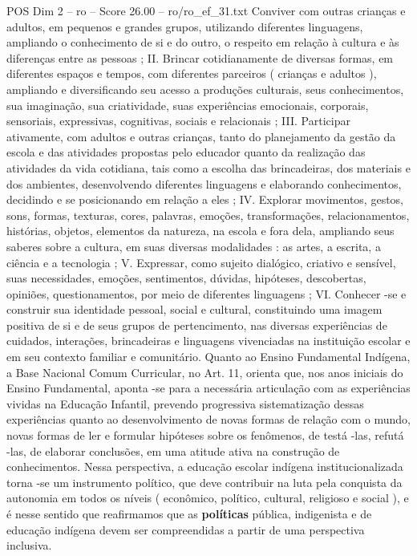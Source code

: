 \begin{textsample}{POS Dim 2 – ro – Score 26.00 – ro/ro\_ef\_31.txt}
Conviver com outras crianças e adultos, em pequenos e grandes grupos, utilizando diferentes linguagens, ampliando o conhecimento de si e do outro, o respeito em relação à cultura e às diferenças entre as pessoas ; II.
Brincar cotidianamente de diversas formas, em diferentes espaços e tempos, com diferentes parceiros ( crianças e adultos ), ampliando e diversificando seu acesso a produções culturais, seus conhecimentos, sua imaginação, sua criatividade, suas experiências emocionais, corporais, sensoriais, expressivas, cognitivas, sociais e relacionais ; III.
Participar ativamente, com adultos e outras crianças, tanto do planejamento da gestão da escola e das atividades propostas pelo educador quanto da realização das atividades da vida cotidiana, tais como a escolha das brincadeiras, dos materiais e dos ambientes, desenvolvendo diferentes linguagens e elaborando conhecimentos, decidindo e se posicionando em relação a eles ; IV.
Explorar movimentos, gestos, sons, formas, texturas, cores, palavras, emoções, transformações, relacionamentos, histórias, objetos, elementos da natureza, na escola e fora dela, ampliando seus saberes sobre a cultura, em suas diversas modalidades : as artes, a escrita, a ciência e a tecnologia ; V.
Expressar, como sujeito dialógico, criativo e sensível, suas necessidades, emoções, sentimentos, dúvidas, hipóteses, descobertas, opiniões, questionamentos, por meio de diferentes linguagens ; VI.
Conhecer -se e construir sua identidade pessoal, social e cultural, constituindo uma imagem positiva de si e de seus grupos de pertencimento, nas diversas experiências de cuidados, interações, brincadeiras e linguagens vivenciadas na instituição escolar e em seu contexto familiar e comunitário.
Quanto ao Ensino Fundamental Indígena, a Base Nacional Comum Curricular, no Art. 11, orienta que, nos anos iniciais do Ensino Fundamental, aponta -se para a necessária articulação com as experiências vividas na Educação Infantil, prevendo progressiva sistematização dessas experiências quanto ao desenvolvimento de novas formas de relação com o mundo, novas formas de ler e formular hipóteses sobre os fenômenos, de testá -las, refutá -las, de elaborar conclusões, em uma atitude ativa na construção de conhecimentos.
Nessa perspectiva, a educação escolar indígena institucionalizada torna -se um instrumento político, que deve contribuir na luta pela conquista da autonomia em todos os níveis ( econômico, político, cultural, religioso e social ), e é nesse sentido que reafirmamos que as \textbf{políticas} pública, indigenista e de educação indígena devem ser compreendidas a partir de uma perspectiva inclusiva.

\end{textsample}
